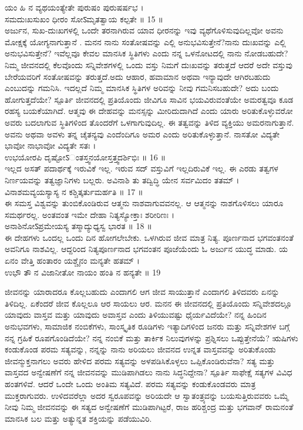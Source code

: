 ಯಂ ಹಿ ನ ವ್ಯಥಯಂತ್ಯೇತೇ ಪುರುಷಂ ಪುರುಷರ್ಷಭ ।\\
ಸಮದುಃಖಸುಖಂ ಧೀರಂ ಸೋऽಮೃತತ್ವಾಯ ಕಲ್ಪತೇ ॥ 15 ॥\\
 ಅರ್ಜುನ, ಸುಖ-ದುಃಖಗಳಲ್ಲಿ ಒಂದೇ ತರನಾಗಿರುವ ಯಾವ ಧೀರನನ್ನು ಇವು ವ್ಯಥೆಗೊಳಿಸುವುದಿಲ್ಲವೋ ಅವನು ಮೋಕ್ಷಕ್ಕೆ ಯೋಗ್ಯನಾಗುತ್ತಾನೆ .
ಮನನ
 ನಾನು ಸಂತೋಷವನ್ನು ಎಲ್ಲಿ ಅನುಭವಿಸುತ್ತೇನೆ?ನಾನು ದುಃಖವನ್ನು ಎಲ್ಲಿ ಅನುಭವಿಸುತ್ತೇನೆ? ಇವೆಲ್ಲವೂ ಕೇವಲ ಮಾನಸಿಕ ಸ್ಥಿತಿಗಳು ಎಂದು ನನ್ನ ಒಳನೋಟದಲ್ಲಿ ನಾನು ನೋಡಬಹುದೇ? ನಿಮ್ಮ ಜೀವನದಲ್ಲಿ ಕೆಲವೊಂದು ಸನ್ನಿವೇಶಗಳಲ್ಲಿ ಒಂದು ವಸ್ತು ನಿಮಗೆ ದುಃಖವನ್ನು ತರುತ್ತದೆ ಆದರೆ ಅದೇ ವಸ್ತುವು ಬೇರೆಯವರಿಗೆ ಸಂತೋಷವನ್ನು ತರುತ್ತದೆ.ಅದು ಆಹಾರ, ಹವಾಮಾನ ಅಥವಾ ಇನ್ಯಾವುದೇ ಆಗಿರಬಹುದು ಎಂಬುದನ್ನು ಗಮನಿಸಿ. ಇದಲ್ಲದೆ ನಿಮ್ಮ ಮಾನಸಿಕ ಸ್ಥಿತಿಗಳ ಅರಿವನ್ನು ನೀವು ಗಮನಿಸಬಹುದೇ? ಅದು ಬಂದು ಹೋಗುತ್ತದೆಯೇ?
 ಸ್ಪೂರ್ತಿ 
 ಜೀವನದಲ್ಲಿ ಪ್ರತಿಯೊಂದು ಜೀವಿಗೂ ಸಾವಿನ ಭಯವಿರುವಂತೆಯೇ ಅಮರತ್ವವೂ ಕೂಡ ರಹಸ್ಯ ಬಯಕೆಯಾಗಿದೆ. ಆತ್ಮವು ಈ ದೇಹವನ್ನು ಮನಸ್ಸನ್ನು ಮೀರಿದುದಾಗಿದೆ ಎಂದು ಯಾರು ಅರಿತುಕೊಳ್ಳುವರೋ ಅವರು ಬದಲಾಗುವ ಸ್ಥಿತಿಗಳಿಂದ ತೊಂದರೆಗೆ ಒಳಗಾಗುವುದಿಲ್ಲ. ಈ ತತ್ವವನ್ನು ತಿಳಿದ ವ್ಯಕ್ತಿಯು ಅಮರನಾಗುತ್ತಾನೆ. ಅವನು ಅಥವಾ ಅವಳು ತನ್ನ ಚೈತನ್ಯವು ಎಂದೆಂದಿಗೂ ಅಮರ ಎಂದು ಅರಿತುಕೊಳ್ಳುತ್ತಾನೆ.
ನಾಸತೋ ವಿದ್ಯತೇ ಭಾವೋ ನಾಭಾವೋ ವಿದ್ಯತೇ ಸತಃ ।\\
ಉಭಯೋರಪಿ ದೃಷ್ಟೋऽಂತಸ್ತ್ವನಯೋಸ್ತತ್ತ್ವದರ್ಶಿಭಿಃ ॥ 16 ॥\\
 ಇಲ್ಲದ ಅಸತ್ ಪದಾರ್ಥಕ್ಕೆ ಇರುವಿಕೆ ಇಲ್ಲ. ಇರುವ ಸದ್ ವಸ್ತುವಿಗೆ ಇಲ್ಲದಿರುವಿಕೆ ಇಲ್ಲ.  ಈ ಎರಡು ತತ್ವಗಳ ನಿರ್ಣಯವನ್ನು ತತ್ವಜ್ಞಾನಿಗಳು ಬಲ್ಲರು.
ಅವಿನಾಶಿ ತು ತದ್ವಿದ್ಧಿ ಯೇನ ಸರ್ವಮಿದಂ ತತಮ್ ।\\
ವಿನಾಶಮವ್ಯಯಸ್ಯಾಸ್ಯ ನ ಕಶ್ಚಿತ್ಕರ್ತುಮರ್ಹತಿ ॥ 17 ॥\\
 ಈ ಸಮಸ್ತ ವಿಶ್ವವನ್ನು ತುಂಬಿಕೊಂಡಿರುವ ಆತ್ಮನು ನಾಶವಾಗುವವನಲ್ಲ. ಆ ಆತ್ಮನನ್ನು ನಾಶಗೊಳಿಸಲು ಯಾರೂ ಸಮರ್ಥರಲ್ಲ.
ಅಂತವಂತ ಇಮೇ ದೇಹಾ ನಿತ್ಯಸ್ಯೋಕ್ತಾಃ ಶರೀರಿಣಃ ।\\
ಅನಾಶಿನೋऽಪ್ರಮೇಯಸ್ಯ ತಸ್ಮಾದ್ಯುಧ್ಯಸ್ವ ಭಾರತ ॥ 18 ॥\\
 ಈ ದೇಹಗಳು ಒಂದಲ್ಲ ಒಂದು ದಿನ ಹೋಗಲೇಬೇಕು. ಒಳಗಿರುವ ಜೀವ ಮಾತ್ರ ನಿತ್ಯ. ಪೂರ್ಣನಾದ ಭಗವಂತನಂತೆ ಅವನಿಗೂ ನಾಶವಿಲ್ಲ. ಆದ್ದರಿಂದ ನಿತ್ಯಪೂರ್ಣನಾದ ಭಗವಂತನ ಪೂಜೆಯೆಂದು ಓ ಅರ್ಜುನ ಯುದ್ಧ ಮಾಡು.
ಯ ಏನಂ ವೇತ್ತಿ ಹಂತಾರಂ ಯಶ್ಚೈನಂ ಮನ್ಯತೇ ಹತಮ್ ।\\
ಉಭೌ ತೌ ನ ವಿಜಾನೀತೋ ನಾಯಂ ಹಂತಿ ನ ಹನ್ಯತೇ ॥ 19 

 ಜೀವನನ್ನು ಯಾರಾದರೂ ಕೊಲ್ಲಬಹುದು ಎಂದಾಗಲಿ ಆಗ ಜೀವ ಸಾಯುತ್ತಾನೆ ಎಂದಾಗಲಿ ತಿಳಿದವರು ಏನನ್ನು ತಿಳಿದಿಲ್ಲ. ಏಕೆಂದರೆ ಜೀವ ಕೊಲ್ಲಲೂ ಆರ ಸಾಯಲು ಆರ.
ಮನನ 
 ಈ ಜೀವನದಲ್ಲಿ ಪ್ರತಿಯೊಂದು ಸನ್ನಿವೇಶದಲ್ಲೂ ಯಾವುದು ವಾಸ್ತವ ಮತ್ತು ಯಾವುದು ಅವಾಸ್ತವ ಎಂದು ತಿಳಿಯುವಷ್ಟು ಧೈರ್ಯವಿದೆಯೇ? ನನ್ನ ಹಿಂದಿನ ಅನುಭವಗಳು, ಸಾಮಾಜಿಕ ನಂಬಿಕೆಗಳು, ಸಾಂಸ್ಕೃತಿಕ ರೂಡಿಗಳು ಇತ್ಯಾದಿಗಳಿಂದ ಜನರು ಮತ್ತು ಸನ್ನಿವೇಶಗಳ ಬಗ್ಗೆ ನನ್ನ ಗ್ರಹಿಕೆ ರೂಪಗೊಂಡಿದೆಯೇ? ನನ್ನ ನಂಬಿಕೆ ಮತ್ತು ತಾರ್ಕಿಕ ನಿಲುವುಗಳನ್ನು ಪ್ರಶ್ನಿಸಲು ಒಪ್ಪುತ್ತೇನೆಯೆ? ಋಷಿಗಳು ಕಂಡುಕೊಂಡ ಪರಮ ಸತ್ಯವನ್ನು, ನನ್ನನ್ನು ನಾನು ಅರಿಯಲು ಜೀವನದ ಉನ್ನತ ವಾಸ್ತವವನ್ನು ಅರಿತುಕೊಂಡು ಜೀವನ್ಮುಕ್ತನಾಗಲು ಅವರು ಹೇಳಿದ ಪರಮ ಸತ್ಯವನ್ನು ಅಳಪಡಿಸಿಕೊಳ್ಳಲು ಒಪ್ಪಿಕೊಂಡಿರುವೆನಾ? ಸತ್ಯ ಮತ್ತು ವಾಸ್ತವದ ಅನ್ವೇಷಣೆಗೆ ನನ್ನ ಜೀವನವನ್ನು ಮುಡಿಪಾಗಿಡಲು ನಾನು ಸಿದ್ಧನಿದ್ದೇನಾ?
 ಸ್ಪೂರ್ತಿ 
 ಸಾಫೇಕ್ಷೆ ಸತ್ಯಗಳ ವಿವಿಧ ಹಂತಗಳಿವೆ. ಆದರೆ ಒಂದೇ ಒಂದು ಅಂತಿಮ ಸತ್ಯವಿದೆ. ಪರಮ ಸತ್ಯವನ್ನು ಕಂಡುಕೊಂಡವರು ಮಾತ್ರ ಮುಕ್ತರಾಗುವರು. ಉಳಿದವರೆಲ್ಲಾ ಅದರ ಸ್ವರೂಪವನ್ನು ಅರಿಯದೇ ಆ ಸ್ವಾತಂತ್ರ್ಯವನ್ನು ಬಯಸುತ್ತಿರುವವರು ಒಮ್ಮೆ ನೀವು ನಿಮ್ಮ ಜೀವನವನ್ನು ಈ ಸತ್ಯದ ಅನ್ವೇಷಣೆಗೆ ಮುಡಿಪಾಗಿಟ್ಟರೆ, ರಾಜ ಹರಿಶ್ಚಂದ್ರ ಮತ್ತು ಭಗವಾನ್ ರಾಮನಂತೆ ಮಾನಸಿಕ ಬಲ ಮತ್ತು ಅತ್ಯುನ್ನತ ಶಕ್ತಿಯನ್ನು ಪಡೆಯುವಿರಿ.


